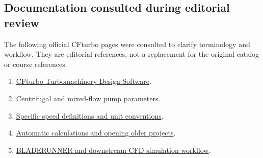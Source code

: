 \documentclass[11pt,a4paper]{article}
\begin{document}
\subsection{Documentation consulted during editorial review}
The following official CFturbo pages were consulted to clarify terminology and workflow. They are editorial references, not a replacement for the original catalog or course references.
\begin{enumerate}
\item \href{https://manual.cfturbo.com/en/cfturbo.html}{CFturbo Turbomachinery Design Software}.
\item \href{https://manual.cfturbo.com/en/md_parameters_pumpvent.html}{Centrifugal and mixed-flow pump parameters}.
\item \href{https://manual.cfturbo.com/en/prefunits_nq.html}{Specific speed definitions and unit conventions}.
\item \href{https://manual.cfturbo.com/en/automatic_updates.html}{Automatic calculations and opening older projects}.
\item \href{https://manual.cfturbo.com/BLADERUNNER/index.html}{BLADERUNNER and downstream CFD simulation workflow}.
\end{enumerate}
\end{document}
